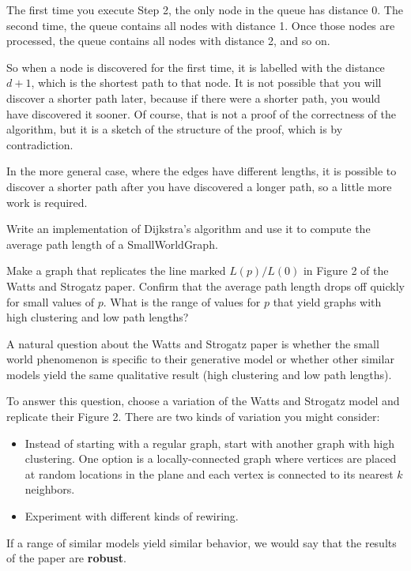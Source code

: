 \documentclass[10pt]{book}
\begin{document}
The first time you execute Step 2, the only node in the queue
has distance 0.  The second time, the queue contains all
nodes with distance 1.  Once those nodes are processed, the
queue contains all nodes with distance 2, and so on.

So when a node is discovered for the first time, it is labelled
with the distance $d+1$, which is the shortest path to that
node.  It is not possible that you will discover a shorter
path later, because if there were a shorter path, you would
have discovered it sooner.  Of course, that is not a proof
of the correctness of the algorithm, but it is a sketch of
the structure of the proof, which is by contradiction.

In the more general case, where the edges have different lengths,
it is possible to discover a shorter path after you have
discovered a longer path, so a little more work is required.

\begin{ex}

Write an implementation of Dijkstra's algorithm and use it
to compute the average path length of a SmallWorldGraph.

Make a graph that replicates the line marked $L(p)/L(0)$ in
Figure 2 of the Watts and Strogatz paper.  Confirm that the 
average path length drops off quickly for
small values of $p$.  What is the range of values for $p$
that yield graphs with high clustering and low path lengths?

\end{ex}


\begin{ex}

A natural question about the Watts and Strogatz paper is
whether the small world phenomenon is specific to their
generative model or whether other similar models yield
the same qualitative result (high clustering and low path lengths).

To answer this question, choose a variation of the
Watts and Strogatz model and replicate their Figure 2.
There are two kinds of variation you might consider:

\begin{itemize}

\item Instead of starting with a regular graph, start with
another graph with high clustering.  One option is a locally-connected
graph where vertices are placed at random locations in the plane
and each vertex is connected to its nearest $k$ neighbors.

\item Experiment with different kinds of rewiring.

\end{itemize}

If a range of similar models yield similar behavior, we
would say that the results of the paper are {\bf robust}.

\end{ex}
\end{document}
